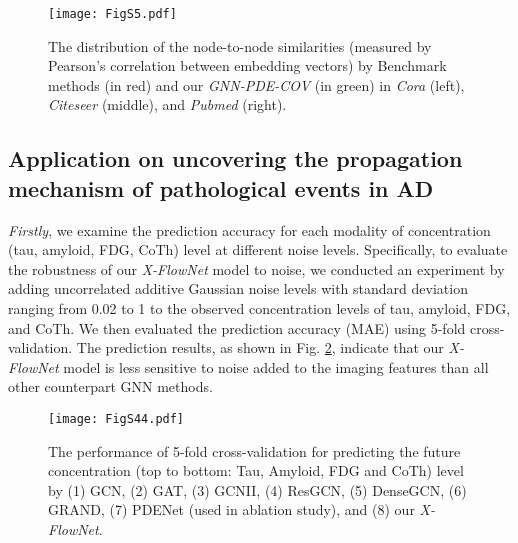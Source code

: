 \documentclass{article}
\begin{document}

\begin{figure}[h]
  \centering
  \texttt{[image: FigS5.pdf]}
  \caption{The distribution of the node-to-node similarities (measured by Pearson's correlation between embedding vectors) by Benchmark methods (in red) and our \textit{GNN-PDE-COV} (in green) in \textit{Cora} (left), \textit{Citeseer} (middle), and \textit{Pubmed} (right).}
  \label{figs5}
\end{figure}


\subsection{Application on uncovering the propagation mechanism of pathological events in AD}

\textit{Firstly}, we examine the prediction accuracy for each modality of concentration (tau, amyloid, FDG, CoTh) level at different noise levels. Specifically, to evaluate the robustness of our \textit{X-FlowNet} model to noise, we conducted an experiment by adding uncorrelated additive Gaussian noise levels with standard deviation ranging from 0.02 to 1 to the observed concentration levels of tau, amyloid, FDG, and CoTh. We then evaluated the prediction accuracy (MAE) using 5-fold cross-validation. The prediction results, as shown in Fig. \ref{figs3}, indicate that our \textit{X-FlowNet} model is less sensitive to noise added to the imaging features than all other counterpart GNN methods.

\begin{figure}[h]
  \centering
  \texttt{[image: FigS44.pdf]}
  \caption{The performance of 5-fold cross-validation for predicting the future concentration (top to bottom: Tau, Amyloid, FDG and CoTh) level by (1) GCN, (2) GAT, (3) GCNII, (4) ResGCN, (5) DenseGCN, (6) GRAND, (7) PDENet (used in ablation study), and (8) our \textit{X-FlowNet}.}
  \label{figs3}
\end{figure}
\end{document}
